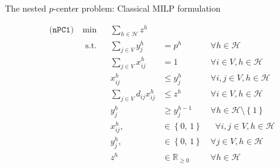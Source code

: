 \documentclass[utf8,aspectratio=169,ngerman,english]{beamer}
\newcommand{\nPC}{\hyperref[eq:nPC]{\texttt{(nPC1)}}}
\newcommand{\inH}{h \in \mathcal H}
\begin{document}
\begin{frame}{The nested $p$-center problem: Classical MILP formulation}
\begin{minipage}[t]{0.45\textwidth}
\begin{block}
            \vspace*{-12pt}
            \begin{subequations}
                \begin{alignat}{4}
                     & \nPC\  & \min         &  & \sum_{\inH}z^{h}          &                                      &                                               \\
                     &        & \text{ s.t.} &  & \sum_{j \in V}y_{j}^h        & =     p^{h}                          & \forall \inH                                   \\
                     &        &              &  & \sum_{j \in V}x_{ij}^h       & =     1                              & \forall i \in V, \inH                             \\
                     &        &              &  & x_{ij}^h                  & \leq  y_j^{h}                        & \forall i,j \in V, \inH                       \\
                     &        &              &  & \sum_{j \in V}d_{ij}x_{ij}^h & \leq  z^{h}                          & \forall i \in V, \inH                               \\
                     &        &              &  & y_{j}^h                   & \geq  y_j^{h-1}                      & \forall \inH \setminus \left \{1 \right \}       \\
                     &        &              &  & x_{ij}^h,                 & \in   \left \{\text{0, 1}\right \}\  & \;\; \forall i,j \in V, \inH                           \\
                     &        &              &  & y_{j}^h,                  & \in   \left \{\text{0, 1}\right \}   & \forall j \in V, \inH                                 \\
                     &        &              &  & z^{h}                     & \in   \mathbb R_{\ge 0}              & \forall \inH                                  
                \end{alignat}  \label{eq:nPC}
            \end{subequations}
        \end{block}
    \end{minipage}
\end{frame}
\end{document}
